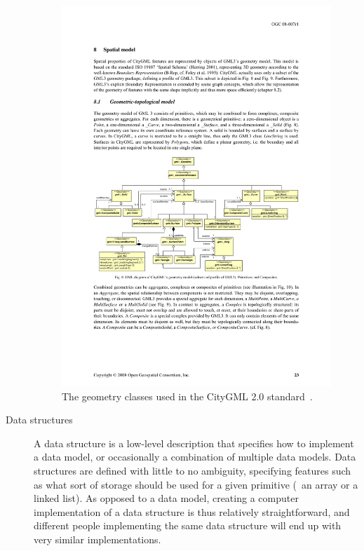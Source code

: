 \begin{description}
\begin{figure}
\centering
\includegraphics[width=\linewidth]{figs/citygml.pdf}
\caption{The geometry classes used in the CityGML 2.0 standard~\citep{CityGML2.0}.}%
\label{fig:citygml}
\end{figure}

\item[Data structures]

A data structure is a low-level description that specifies how to implement a data model, or occasionally a combination of multiple data models.
Data structures are defined with little to no ambiguity, specifying features such as what sort of storage should be used for a given primitive (\eg\ an array or a linked list). 
As opposed to a data model, creating a computer implementation of a data structure is thus relatively straightforward, and different people implementing the same data structure will end up with very similar implementations.


\end{description}
